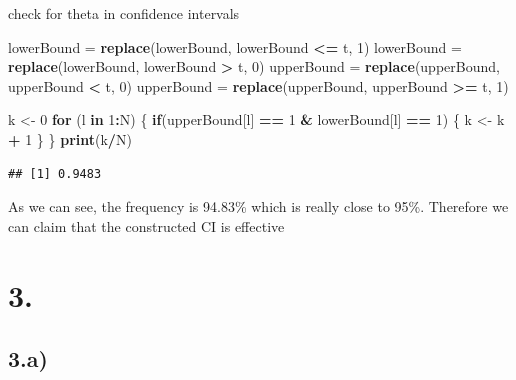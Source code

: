 \documentclass[
]{article}
\newenvironment{Shaded}{\begin{snugshade}}{\end{snugshade}}
\newcommand{\ControlFlowTok}[1]{\textcolor[rgb]{0.13,0.29,0.53}{\textbf{#1}}}
\newcommand{\DecValTok}[1]{\textcolor[rgb]{0.00,0.00,0.81}{#1}}
\newcommand{\KeywordTok}[1]{\textcolor[rgb]{0.13,0.29,0.53}{\textbf{#1}}}
\newcommand{\NormalTok}[1]{#1}
\newcommand{\OperatorTok}[1]{\textcolor[rgb]{0.81,0.36,0.00}{\textbf{#1}}}
\newcommand{\StringTok}[1]{\textcolor[rgb]{0.31,0.60,0.02}{#1}}
\begin{document}
check for theta in confidence intervals

\begin{Shaded}
\begin{Highlighting}[]
\NormalTok{lowerBound =}\StringTok{ }\KeywordTok{replace}\NormalTok{(lowerBound, lowerBound }\OperatorTok{<=}\StringTok{ }\NormalTok{t, }\DecValTok{1}\NormalTok{)}
\NormalTok{lowerBound =}\StringTok{ }\KeywordTok{replace}\NormalTok{(lowerBound, lowerBound }\OperatorTok{>}\StringTok{ }\NormalTok{t, }\DecValTok{0}\NormalTok{)}
\NormalTok{upperBound =}\StringTok{ }\KeywordTok{replace}\NormalTok{(upperBound, upperBound }\OperatorTok{<}\StringTok{ }\NormalTok{t, }\DecValTok{0}\NormalTok{)}
\NormalTok{upperBound =}\StringTok{ }\KeywordTok{replace}\NormalTok{(upperBound, upperBound }\OperatorTok{>=}\StringTok{ }\NormalTok{t, }\DecValTok{1}\NormalTok{)}

\NormalTok{k <-}\StringTok{ }\DecValTok{0}
\ControlFlowTok{for}\NormalTok{ (l }\ControlFlowTok{in} \DecValTok{1}\OperatorTok{:}\NormalTok{N) \{}
  \ControlFlowTok{if}\NormalTok{(upperBound[l] }\OperatorTok{==}\StringTok{ }\DecValTok{1} \OperatorTok{&}\StringTok{ }\NormalTok{lowerBound[l] }\OperatorTok{==}\StringTok{ }\DecValTok{1}\NormalTok{) \{}
\NormalTok{    k <-}\StringTok{ }\NormalTok{k }\OperatorTok{+}\StringTok{ }\DecValTok{1}
\NormalTok{  \}}
\NormalTok{\}}
\KeywordTok{print}\NormalTok{(k}\OperatorTok{/}\NormalTok{N)}
\end{Highlighting}
\end{Shaded}

\begin{verbatim}
## [1] 0.9483
\end{verbatim}

As we can see, the frequency is 94.83\% which is really close to 95\%.
Therefore we can claim that the constructed CI is effective

\hypertarget{section-3}{%
\section{3.}\label{section-3}}

\hypertarget{a-1}{%
\subsection{3.a)}\label{a-1}}
\end{document}
